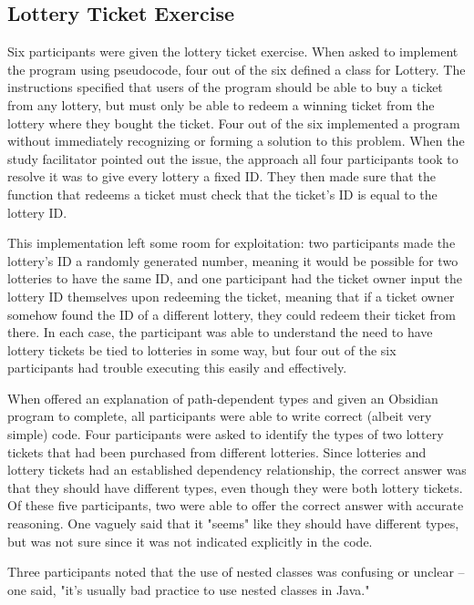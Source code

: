 \documentclass[sigplan,10pt,review]{acmart}\settopmatter{printfolios=true}
\begin{document}
\subsection{Lottery Ticket Exercise}	
	
Six participants were given the lottery ticket exercise. When asked to implement the program using pseudocode, four out of the six defined 
a class for Lottery. The instructions specified that users of the program should be able to buy a ticket from any lottery, but must only be 
able to redeem a winning ticket from the lottery where they bought the ticket. Four out of the six implemented a program without 
immediately recognizing or forming a solution to this problem. When the study facilitator pointed out the issue, the approach all four 
participants took to resolve it was to give every lottery a fixed ID. They then made sure that the function that redeems a ticket must check 
that the ticket's ID is equal to the lottery ID. 

This implementation left some room for exploitation: two participants made the lottery's ID a randomly generated number, meaning it would be 
possible for two lotteries to have the same ID, and one  participant had the ticket owner input the lottery ID themselves upon redeeming 
the ticket, meaning that if a ticket owner somehow found the ID of a different lottery, they could redeem their ticket from there.
In each case, the participant was able to understand the need to have lottery tickets be tied to 
lotteries in some way, but four out of the six participants had trouble executing this easily and effectively. 

When offered an explanation of path-dependent types and given an Obsidian program to complete, all participants were able to write 
correct (albeit very simple) code. Four participants were asked to identify the types of two lottery tickets that had been purchased from different 
lotteries. Since lotteries and lottery tickets had an established dependency relationship, the correct answer was that they should have different 
types, even though they were both lottery tickets. Of these five participants, two were able to offer the correct answer with accurate reasoning. 
One vaguely said that it "seems" like they should have different types, but was not sure since it was not indicated explicitly in the code. 

Three participants noted that the use of nested classes was confusing or unclear -- one said, "it's usually bad practice to use nested 
classes in Java."
\end{document}
